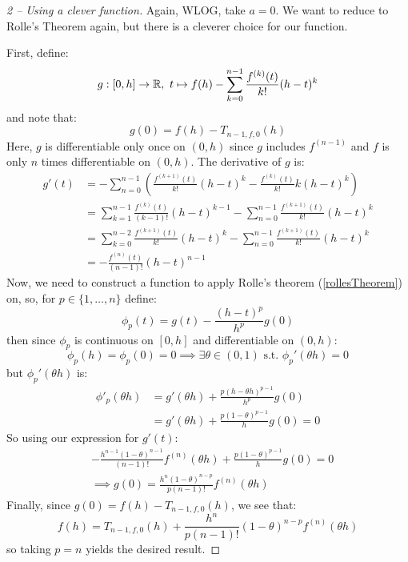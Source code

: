\documentclass[../main.tex]{subfiles}
\begin{document}
\begin{proof}[2 -- Using a clever function]
  Again, WLOG, take $a = 0$.
  We want to reduce to Rolle's Theorem again, but there is a cleverer choice for our function.

  First, define:
  \[
    g: [0, h] \to \mathbb{R},\ t \mapsto f(h) - \sum_{k = 0}^{n - 1} \frac{f^{(k)}(t)}{k!}(h - t)^{k}
  \]
  and note that:
  \[
    g(0) = f(h) - T_{n - 1, f, 0} (h)
  \]
  Here, $g$ is differentiable only once on $(0, h)$ since $g$ includes $f^{(n - 1)}$ and $f$ is only $n$ times differentiable on $(0, h)$.
  The derivative of $g$ is:
  \begin{align*}
    g'(t) &= -\sum_{n=0}^{n - 1} \left(\frac{f^{(k + 1)}(t)}{k!}(h - t)^{k} - \frac{f^{(k)}(t)}{k!}k(h - t)^{k}\right) \\
          &= \sum_{k = 1}^{n - 1} \frac{f^{(k)}(t)}{(k - 1)!}(h - t)^{k - 1} - \sum_{n=0}^{n - 1} \frac{f^{(k + 1)}(t)}{k!}(h - t)^{k} \\
          &= \sum_{k = 0}^{n - 2} \frac{f^{(k + 1)}(t)}{k!}(h - t)^{k} - \sum_{n=0}^{n - 1} \frac{f^{(k + 1)}(t)}{k!}(h - t)^{k} \\
          &= -\frac{f^{(n)}(t)}{(n - 1)!}(h - t)^{n - 1}
  \end{align*}
  Now, we need to construct a function to apply Rolle's theorem (\cref{rollesTheorem}) on, so, for $p \in \{1, \ldots, n\}$ define:
  \[
    \phi_p(t) = g(t) - \frac{(h - t)^{p}}{h^{p}}g(0)
  \]
  then since $\phi_p$ is continuous on $[0, h]$ and differentiable on $(0, h)$:
  \[
    \phi_p(h) = \phi_p(0) = 0 \implies \exists \theta \in (0, 1) \text{ s.t. } \phi_p'(\theta h) = 0
  \]
  but $\phi_p'(\theta h)$ is:
  \begin{align*}
    \phi'_p(\theta h) &= g'(\theta h) + \frac{p(h - \theta h)^{p - 1}}{h^{p}}g(0)\\
                      &= g'(\theta h) + \frac{p(1 - \theta)^{p - 1}}{h}g(0) = 0
  \end{align*}
  So using our expression for $g'(t)$:
  \begin{align*}
    &-\frac{h^{n - 1}(1 - \theta)^{n - 1}}{(n - 1)!} f^{(n)}(\theta h) + \frac{p(1 - \theta)^{p - 1}}{h}g(0) = 0 \\
    &\implies g(0) = \frac{h^{n}(1 - \theta)^{n - p}}{p(n - 1)!}f^{(n)}(\theta h)
  \end{align*}
  Finally, since $g(0) = f(h) - T_{n - 1, f, 0}(h)$, we see that:
  \begin{equation}
    f(h) = T_{n - 1, f, 0}(h) + \frac{h^{n}}{p(n - 1)!}(1 - \theta)^{n - p}f^{(n)}(\theta h) \label{pRemainder}
  \end{equation}
  so taking $p = n$ yields the desired result.
\end{proof}
\end{document}
